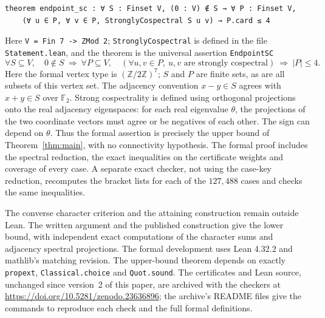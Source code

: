\documentclass[11pt]{article}
\theoremstyle{definition}
\newcommand{\F}{\mathbb F}
\begin{document}
\begin{lstlisting}
theorem endpoint_sc : ∀ S : Finset V, (0 : V) ∉ S → ∀ P : Finset V,
    (∀ u ∈ P, ∀ v ∈ P, StronglyCospectral S u v) → P.card ≤ 4
\end{lstlisting}
Here \texttt{V = Fin 7 -> ZMod 2}; \texttt{StronglyCospectral} is defined in the
file \texttt{Statement.lean}, and the theorem is the universal
assertion \texttt{EndpointSC}
\[
 \forall S\subseteq V,\quad 0\notin S\ \Longrightarrow\
 \forall P\subseteq V,\quad
 (\forall u,v\in P,\ u,v\text{ are strongly cospectral})
 \ \Longrightarrow\ |P|\leq4.
\]
Here the formal vertex type is $(\mathbb Z/2\mathbb Z)^7$;
$S$ and $P$ are finite sets, as are all subsets of this vertex set.
The adjacency convention $x-y\in S$ agrees with $x+y\in S$ over
$\F_2$. Strong cospectrality is defined using orthogonal projections
onto the real adjacency eigenspaces: for each real eigenvalue $\theta$,
the projections of the two coordinate vectors must agree or be negatives
of each other. The sign can depend on $\theta$. Thus the formal assertion is precisely the upper bound
of Theorem~\ref{thm:main}, with no connectivity hypothesis.
The formal proof includes the spectral reduction, the exact inequalities
on the certificate weights and coverage of every case. A separate exact
checker, not using the case-key reduction, recomputes the bracket lists
for each of the $127{,}488$ cases and checks the same inequalities.

The converse character criterion and the attaining construction remain
outside Lean. The written argument and the published construction give
the lower bound, with independent exact computations of the character
sums and adjacency spectral projections. The formal development uses Lean 4.32.2 and mathlib's matching revision.
The upper-bound theorem depends on exactly \texttt{propext},
\texttt{Classical.choice} and \texttt{Quot.sound}. The certificates
and Lean source, unchanged since version~2 of this paper, are archived
with the checkers at \url{https://doi.org/10.5281/zenodo.23636896}; the
archive's README files give the commands to reproduce each check and the
full formal definitions.
\end{document}
